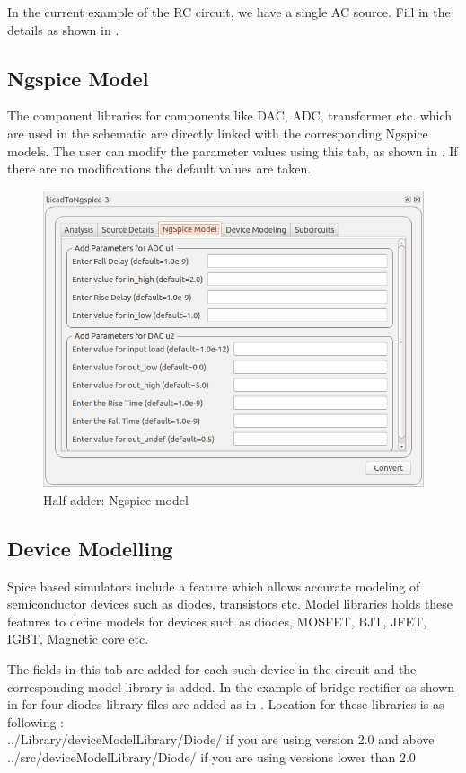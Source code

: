 In the current example of the RC circuit, we have a single AC source. Fill in the details as shown in .

\subsection {Ngspice Model} \label{ngspicemodel}
The component libraries for components like DAC, ADC, transformer etc. which are used in the schematic are directly linked with the corresponding Ngspice models. The user can modify the parameter values using this tab, as shown in . If there are no modifications the default values are taken.

\begin{figure}
\centering
\includegraphics[width=\lgfig]{manual_images/ngspice-model.png}
\caption{Half adder: Ngspice model}
\label{ngspicemodel}
\end{figure}

\subsection {Device Modelling} \label{devicemodel}
Spice based simulators include a feature which allows accurate modeling of semiconductor devices such as diodes, transistors etc. Model libraries holds these features to define models for devices such as diodes, MOSFET, BJT, JFET, IGBT, Magnetic core etc.

The fields in this tab are added for each such device in the circuit and the corresponding model library is added. In the example of bridge rectifier as shown in  for four diodes library files are added as in . Location for these libraries is as following : \\
../Library/deviceModelLibrary/Diode/ if you are using version 2.0 and above \\
../src/deviceModelLibrary/Diode/ if you are using versions lower than 2.0

